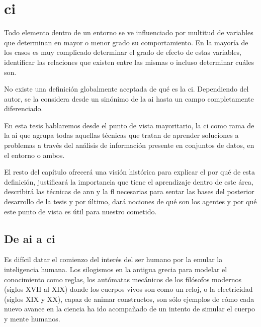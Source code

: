 \chapter{\Acrlong{ci}}
\label{ch:sota-ci}

Todo elemento dentro de un entorno se ve influenciado por multitud de variables que determinan en mayor o menor grado su comportamiento. En la mayoría de los casos es muy complicado determinar el grado de efecto de estas variables, identificar las relaciones que existen entre las mismas o incluso determinar cuáles son.

No existe una definición globalmente aceptada de qué es la \acf{ci}. Dependiendo del autor, se la considera desde un sinónimo de la \acf{ai} hasta un campo completamente diferenciado.

En esta tesis hablaremos desde el punto de vista mayoritario, la \ac{ci} como rama de la \ac{ai} que agrupa todas aquellas técnicas que tratan de aprender soluciones a problemas a través del análisis de información presente en conjuntos de datos, en el entorno o ambos.

El resto del capítulo ofrecerá una visión histórica para explicar el por qué de esta definición, justificará la importancia que tiene el aprendizaje dentro de este área, describirá las técnicas de \ac{ann} y la \ac{fl} necesarias para sentar las bases del posterior desarrollo de la tesis y por último, dará nociones de qué son los agentes y por qué este punto de vista es útil para nuestro cometido.

\section{De \acrlong{ai} a \acrlong{ci}}

Es difícil datar el comienzo del interés del ser humano por la emular la inteligencia humana. Los silogismos en la antigua grecia para modelar el conocimiento como reglas, los autómatas mecánicos de los filósofos modernos (siglos XVII al XIX) donde los cuerpos vivos son como un reloj, o la electricidad (siglos XIX y XX), capaz de animar constructos, son sólo ejemplos de cómo cada nuevo avance en la ciencia ha ido acompañado de un intento de simular el cuerpo y mente humanos.

